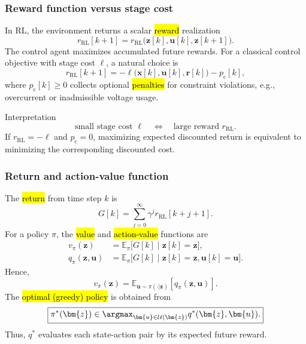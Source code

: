 \begin{frame}
	\frametitle{Reward function versus stage cost}
	In RL, the environment returns a scalar \hl{reward} realization
	\begin{equation}
		r_{\mathrm{RL}}[k+1]
		=r_{\mathrm{RL}}\bigl(\bm{z}[k],\bm{u}[k],\bm{z}[k+1]\bigr).
	\end{equation}\pause%
	The control agent maximizes accumulated future rewards. For a classical control objective with stage cost $\ell$, a natural choice is
	\begin{equation}
		\boxed{
			r_{\mathrm{RL}}[k+1]
			=-\ell\bigl(\bm{x}[k],\bm{u}[k],\bm{r}[k]\bigr)-p_{\mathrm{c}}[k],}
	\end{equation}
	where $p_{\mathrm{c}}[k]\geq 0$ collects optional \hl{penalties} for constraint violations, e.g., overcurrent or inadmissible voltage usage.\pause%
	\begin{block}{Interpretation}
		\begin{equation*}
			\text{small stage cost }\ell \quad\Longleftrightarrow\quad \text{large reward }r_{\mathrm{RL}}.
		\end{equation*}
		If $r_{\mathrm{RL}}=-\ell$ and $p_{\mathrm{c}}=0$, maximizing expected discounted return is equivalent to minimizing the corresponding discounted cost.
	\end{block}
\end{frame}



\begin{frame}
	\frametitle{Return and action-value function}
	The \hl{return} from time step $k$ is
	\begin{equation}
		G[k]=\sum_{j=0}^{\infty}\gamma^j r_{\mathrm{RL}}[k+j+1].
	\end{equation}\pause%
	For a policy $\pi$, the \hl{value} and \hl{action-value} functions are
	\begin{align}
		v_{\pi}(\bm{z})
		 & =\mathbb{E}_{\pi}\bigl[G[k]\mid\bm{z}[k]=\bm{z}\bigr],                  \\
		q_{\pi}(\bm{z},\bm{u})
		 & =\mathbb{E}_{\pi}\bigl[G[k]\mid\bm{z}[k]=\bm{z},\bm{u}[k]=\bm{u}\bigr].
	\end{align}\pause%
	Hence,
	\begin{equation}
		v_{\pi}(\bm{z})
		=\mathbb{E}_{\bm{u}\sim\pi(\cdot|\bm{z})}
		\left[q_{\pi}(\bm{z},\bm{u})\right].
	\end{equation}\pause%
	The \hl{optimal (greedy) policy} is obtained from
	\begin{equation}
		\boxed{\pi^{*}(\bm{z})\in
			\argmax_{\bm{u}\in\mathcal{U}(\bm{z})}
			q^{*}(\bm{z},\bm{u}).}
	\end{equation}\pause%
	Thus, $q^{*}$ evaluates each state-action pair by its expected future reward.
\end{frame}

